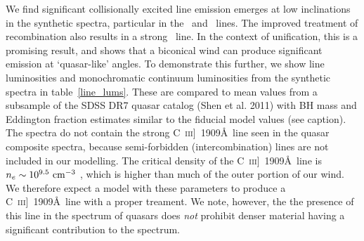 \documentclass[useAMS,usenatbib]{mn2e_x}
\begin{document}
We find significant collisionally excited line emission emerges
at low inclinations in the synthetic spectra, particular in the \civ\ and \nv\
lines. The improved treatment of recombination also results in a strong \la\ line. 
In the context of unification, this is a promising result, 
and shows that a biconical wind can produce significant 
emission at `quasar-like' angles. To demonstrate this further,
we show line luminosities and monochromatic continuum luminosities
from the synthetic spectra in table~\ref{line_lums}. These are compared to
mean values from a subsample of the SDSS DR7 quasar catalog (Shen et al. 2011) 
with BH mass and Eddington fraction estimates similar to the fiducial model values 
(see caption). The spectra do not contain the strong 
C~\textsc{iii}]~1909\AA\, line seen in the quasar composite spectra,
because semi-forbidden (intercombination)
lines are not included in our modelling.
The critical density of the C~\textsc{iii}]~1909\AA\, line 
is $n_e\sim10^{9.5}~\rm{cm^{-3}}$ \citep{wei1988}, which is higher than much of the 
outer portion of our wind. 
We therefore expect a model with these 
parameters to produce a C~\textsc{iii}]~1909\AA\ line
with a proper treament. We note, however, the the presence of
this line in the spectrum of quasars does {\em not} prohibit denser material having a significant contribution to the spectrum.

\end{document}
